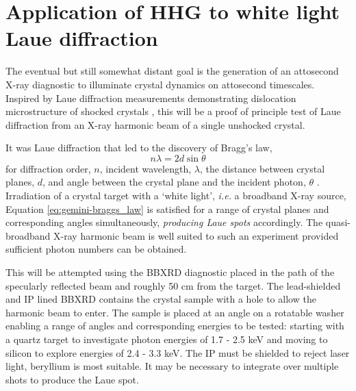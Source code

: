 
\section{Application of HHG to white light Laue diffraction}\label{sec:ch4-laue}
The eventual but still somewhat distant goal is the generation of an attosecond X-ray diagnostic to illuminate crystal dynamics on attosecond timescales. Inspired by Laue diffraction measurements demonstrating dislocation microstructure of shocked crystals \cite{suggitNanosecondWhitelightLaue2012}, this will be a proof of principle test of Laue diffraction from an X-ray harmonic beam of a single unshocked crystal.

It was Laue diffraction that led to the discovery of Bragg's law,
\begin{equation}\label{eq:gemini-braggs_law}
	n\lambda = 2d\sin\theta
\end{equation}
for diffraction order, $n$, incident wavelength, $\lambda$, the distance between crystal planes, $d$, and angle between the crystal plane and the incident photon, $\theta$ \cite{braggDiffractionWaves1915}. Irradiation of a crystal target with a `white light', \textit{i.e. } a broadband X-ray source, Equation \ref{eq:gemini-braggs_law} is satisfied for a range of crystal planes and corresponding angles simultaneously, \textit{producing Laue spots} accordingly. The quasi-broadband X-ray harmonic beam is well suited to such an experiment provided sufficient photon numbers can be obtained.

This will be attempted using the \ac{BBXRD} diagnostic placed in the path of the specularly reflected beam and roughly 50 cm from the target. The lead-shielded and IP lined BBXRD contains the crystal sample with a hole to allow the harmonic beam to enter. The sample is placed at an angle on a rotatable washer enabling a range of angles and corresponding energies to be tested: starting with a quartz target to investigate photon energies of 1.7 - 2.5 keV and moving to silicon to explore energies of 2.4 - 3.3 keV. The IP must be shielded to reject laser light, beryllium is most suitable. It may be necessary to integrate over multiple shots to produce the Laue spot.


